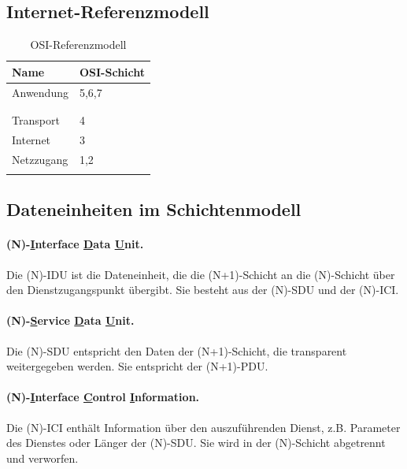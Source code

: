 \documentclass[]{scrartcl}
\begin{document}
\subsection{Internet-Referenzmodell}

\begin{table}[H]
\begin{center}
\begin{tabular}{ll}
 Name  & OSI-Schicht \\
\toprule
 Anwendung &  5,6,7\\
  \\
   \\
\midrule
Transport &  4\\
\midrule
Internet & 3 \\
\midrule
Netzzugang & 1,2 \\
 \\
\bottomrule
\end{tabular}
\caption{OSI-Referenzmodell}

\end{center}
\label{default}
\end{table}%

\subsection{Dateneinheiten im Schichtenmodell}


\paragraph{(N)-\underline{I}nterface \underline{D}ata \underline{U}nit.} Die (N)-IDU ist die Dateneinheit, die die (N+1)-Schicht an die (N)-Schicht \"uber den Dienstzugangspunkt \"ubergibt. Sie besteht aus der (N)-SDU und der (N)-ICI.

\paragraph{(N)-\underline{S}ervice \underline{D}ata \underline{U}nit.} Die (N)-SDU entspricht den Daten der (N+1)-Schicht, die transparent weitergegeben werden. Sie entspricht der (N+1)-PDU.

\paragraph{(N)-\underline{I}nterface \underline{C}ontrol \underline{I}nformation.} Die (N)-ICI enth\"alt Information \"uber den auszuf\"uhrenden Dienst, z.B. Parameter des Dienstes oder L\"anger der (N)-SDU. Sie wird in der (N)-Schicht abgetrennt und verworfen.
\end{document}
